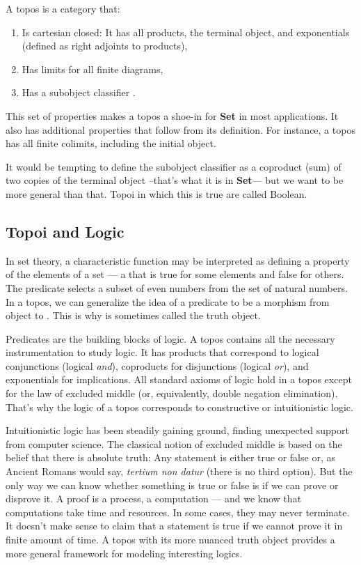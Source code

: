 A topos is a category that:

\begin{enumerate}
\tightlist
\item
  Is cartesian closed: It has all products, the terminal object, and
  exponentials (defined as right adjoints to products),
\item
  Has limits for all finite diagrams,
\item
  Has a subobject classifier .
\end{enumerate}

This set of properties makes a topos a shoe-in for \textbf{Set} in most
applications. It also has additional properties that follow from its
definition. For instance, a topos has all finite colimits, including the
initial object.

It would be tempting to define the subobject classifier as a coproduct
(sum) of two copies of the terminal object --that's what it is in
\textbf{Set}--- but we want to be more general than that. Topoi in which
this is true are called Boolean.

\subsection{Topoi and Logic}\label{topoi-and-logic}

In set theory, a characteristic function may be interpreted as defining
a property of the elements of a set --- a  that is true
for some elements and false for others. The predicate 
selects a subset of even numbers from the set of natural numbers. In a
topos, we can generalize the idea of a predicate to be a morphism from
object  to . This is why  is sometimes
called the truth object.

Predicates are the building blocks of logic. A topos contains all the
necessary instrumentation to study logic. It has products that
correspond to logical conjunctions (logical \emph{and}), coproducts for
disjunctions (logical \emph{or}), and exponentials for implications. All
standard axioms of logic hold in a topos except for the law of excluded
middle (or, equivalently, double negation elimination). That's why the
logic of a topos corresponds to constructive or intuitionistic logic.

Intuitionistic logic has been steadily gaining ground, finding
unexpected support from computer science. The classical notion of
excluded middle is based on the belief that there is absolute truth: Any
statement is either true or false or, as Ancient Romans would say,
\emph{tertium non datur} (there is no third option). But the only way we
can know whether something is true or false is if we can prove or
disprove it. A proof is a process, a computation --- and we know that
computations take time and resources. In some cases, they may never
terminate. It doesn't make sense to claim that a statement is true if we
cannot prove it in finite amount of time. A topos with its more nuanced
truth object provides a more general framework for modeling interesting
logics.

